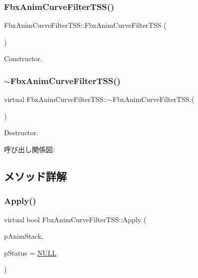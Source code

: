 \subsubsection{\texorpdfstring{Fbx\+Anim\+Curve\+Filter\+T\+S\+S()}{FbxAnimCurveFilterTSS()}}
{\footnotesize\ttfamily Fbx\+Anim\+Curve\+Filter\+T\+S\+S\+::\+Fbx\+Anim\+Curve\+Filter\+T\+SS (\begin{DoxyParamCaption}{ }\end{DoxyParamCaption})}



Constructor. 

\mbox{\label{class_fbx_anim_curve_filter_t_s_s_a6bf44d1312b857b4a866ba0b09f4a027}} 
\subsubsection{\texorpdfstring{$\sim$\+Fbx\+Anim\+Curve\+Filter\+T\+S\+S()}{~FbxAnimCurveFilterTSS()}}
{\footnotesize\ttfamily virtual Fbx\+Anim\+Curve\+Filter\+T\+S\+S\+::$\sim$\+Fbx\+Anim\+Curve\+Filter\+T\+SS (\begin{DoxyParamCaption}{ }\end{DoxyParamCaption})\hspace{0.3cm}{\ttfamily [virtual]}}



Destructor. 

呼び出し関係図\+:


\subsection{メソッド詳解}
\mbox{\label{class_fbx_anim_curve_filter_t_s_s_a7c301b85f939c3614d998f18e7a20f21}} 
\subsubsection{\texorpdfstring{Apply()}{Apply()}\hspace{0.1cm}{\footnotesize\ttfamily [1/5]}}
{\footnotesize\ttfamily virtual bool Fbx\+Anim\+Curve\+Filter\+T\+S\+S\+::\+Apply (\begin{DoxyParamCaption}\item[{\hyperlink{class_fbx_anim_stack}{Fbx\+Anim\+Stack} $\ast$}]{p\+Anim\+Stack,  }\item[{\hyperlink{class_fbx_status}{Fbx\+Status} $\ast$}]{p\+Status = {\ttfamily \hyperlink{fbxarch_8h_a070d2ce7b6bb7e5c05602aa8c308d0c4}{N\+U\+LL}} }\end{DoxyParamCaption})\hspace{0.3cm}{\ttfamily [virtual]}}

